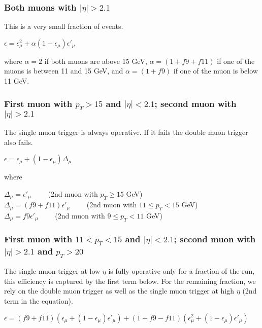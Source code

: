 \subsubsection{Both muons with $|\eta|>2.1$}
This is a very small fraction of events.  

\begin{center}
$\epsilon = \epsilon_{\mu}^2 + \alpha (1-\epsilon_{\mu}) \epsilon'_{\mu}$
\end{center}

\noindent where $\alpha=2$ if both muons are above 15 GeV, $\alpha=(1+f9+f11)$ if
one of the muons is between 11 and 15 GeV, and $\alpha=(1+f9)$ if one of the muon
is below 11 GeV.

\subsubsection{First muon with $p_T>15$ and $|\eta|<2.1$;  second muon 
with $|\eta|>2.1$}
The single muon trigger is always operative.  If it fails the double muon 
trigger also fails.

\begin{center}
$\epsilon = \epsilon_{\mu} + (1-\epsilon_{\mu})\Delta_{\mu}$
\end{center}

\noindent where

\begin{center}
$\Delta_{\mu} = \epsilon'_{\mu}$ ~~~~(2nd muon with $p_T \geq 15$ GeV) \\
$\Delta_{\mu} = (f9+f11)\epsilon'_{\mu}$ ~~~~(2nd muon with $11 \leq p_T < 15$ GeV) \\
$\Delta_{\mu} = f9\epsilon'_{\mu}$ ~~~~(2nd muon with $9 \leq p_T < 11$ GeV) \\
\end{center}


\subsubsection{First muon with $11<p_T<15$ and $|\eta|<2.1$;  second muon 
with $|\eta|>2.1$ and $p_T>20$}
The single muon trigger at low $\eta$ is fully operative only for a fraction of the run,
this efficiency is captured by the first term below.
For the remaining fraction, we rely on the double muon trigger as well as the 
single muon trigger at high $\eta$ (2nd term in the equation).

\begin{center}
$\epsilon = (f9+f11)(\epsilon_{\mu} + (1-\epsilon_{\mu})\epsilon'_{\mu})
 + (1-f9-f11)(\epsilon_{\mu}^2 + (1-\epsilon_{\mu})\epsilon'_{\mu})$ 
\end{center}

